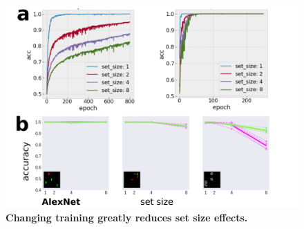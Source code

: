 \documentclass[10pt,letterpaper]{article}
\begin{document}
\begin{figure}[ht]
\begin{center}
\includegraphics[width=\columnwidth]{fig3/fig3.png}
\end{center}
\caption{
\textbf{Changing training greatly reduces set size effects.}
} 
\label{fig3}
\end{figure}
\end{document}
